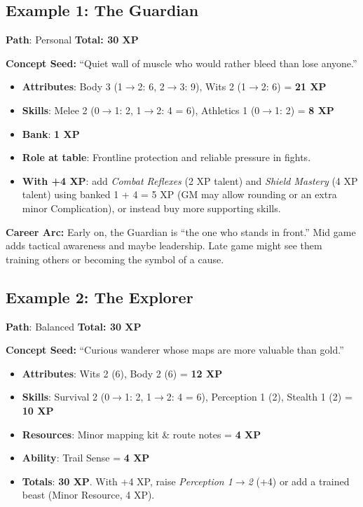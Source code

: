 \subsection*{Example 1: The Guardian}
\label{sec:xp-ex-guardian}

\textbf{Path}: Personal \quad \textbf{Total: 30 XP}

\medskip

\noindent\textbf{Concept Seed:} ``Quiet wall of muscle who would rather bleed than lose anyone.''

\begin{itemize}
\item \textbf{Attributes}: Body 3 (1$\to$2: 6, 2$\to$3: 9), Wits 2 (1$\to$2: 6) = \textbf{21 XP}
\item \textbf{Skills}: Melee 2 (0$\to$1: 2, 1$\to$2: 4 = 6), Athletics 1 (0$\to$1: 2) = \textbf{8 XP}
\item \textbf{Bank}: \textbf{1 XP}
\item \textbf{Role at table}: Frontline protection and reliable pressure in fights.
\item \textbf{With +4 XP}: add \emph{Combat Reflexes} (2 XP talent) and \emph{Shield Mastery} (4 XP talent) using banked 1 + 4 = 5 XP (GM may allow rounding or an extra minor Complication), or instead buy more supporting skills.
\end{itemize}

\noindent\textbf{Career Arc:} Early on, the Guardian is ``the one who stands in
front.'' Mid game adds tactical awareness and maybe leadership. Late game might
see them training others or becoming the symbol of a cause.

\subsection*{Example 2: The Explorer}
\label{sec:xp-ex-explorer}

\textbf{Path}: Balanced \quad \textbf{Total: 30 XP}

\medskip

\noindent\textbf{Concept Seed:} ``Curious wanderer whose maps are more valuable than gold.''

\begin{itemize}
\item \textbf{Attributes}: Wits 2 (6), Body 2 (6) = \textbf{12 XP}
\item \textbf{Skills}: Survival 2 (0$\to$1: 2, 1$\to$2: 4 = 6), Perception 1 (2), Stealth 1 (2) = \textbf{10 XP}
\item \textbf{Resources}: Minor mapping kit \& route notes = \textbf{4 XP}
\item \textbf{Ability}: Trail Sense = \textbf{4 XP}
\item \textbf{Totals}: \textbf{30 XP}. With +4 XP, raise \emph{Perception 1$\to$2} (+4) or add a trained beast (Minor Resource, 4 XP).
\end{itemize}

